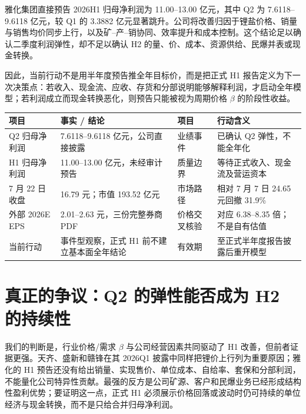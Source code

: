 \begin{houseviewbox}
雅化集团直接预告 2026H1 归母净利润为 11.00--13.00 亿元，其中 Q2 为 7.6118--9.6118 亿元，较 Q1 的 3.3882 亿元显著跳升。公司将改善归因于锂盐价格、销量与销售均价同步上行，以及矿--产--销协同、效率提升和成本控制。这个结论足以确认二季度利润弹性，却不足以确认 H2 的量、价、成本、资源供给、民爆并表或现金转换。

因此，当前行动不是用半年度预告推全年目标价，而是把正式 H1 报告定义为下一次决策点：若收入、现金流、应收、存货和分部说明能够解释利润，才启动全年模型；若利润成立而现金转换恶化，则预告只能被视为周期价格 $\beta$ 的阶段性收益。
\end{houseviewbox}

\begin{exhibitbox}[事件摘要与行动边界]
\begin{tabularx}{\exhibitboxwidth}{L{3.1cm}X L{3.0cm}X}
\toprule
项目 & 事实 / 结论 & 项目 & 行动含义 \\
\midrule
Q2 归母净利润 & 7.6118--9.6118 亿元，公司直接披露 & 业绩事件 & 已确认 Q2 弹性，不能全年化 \\
H1 归母净利润 & 11.00--13.00 亿元，未经审计预告 & 质量边界 & 等待正式收入、现金流及营运资本 \\
7 月 22 日收盘 & 16.79 元；市值 193.52 亿元 & 市场路径 & 相对 7 月 7 日 24.65 元回撤 31.9\% \\
外部 2026E EPS & 2.01--2.63 元，三份完整券商 PDF & 价格交叉核验 & 对应 6.38--8.35 倍；不是自有估值 \\
当前行动 & 事件型观察，正式 H1 前不建立基本面全年结论 & 有效期 & 至正式半年度报告披露后重开模型 \\
\bottomrule
\end{tabularx}
\end{exhibitbox}

\section{真正的争议：Q2 的弹性能否成为 H2 的持续性}

我们的判断是，行业价格/需求 $\beta$ 与公司经营因素共同驱动了 H1 改善，但前者证据更强。天齐、盛新和赣锋在其 2026Q1 披露中同样把锂价上行列为重要原因；雅化的 H1 预告还没有给出销量、实现售价、单位成本、自给率、套保和分部利润，不能量化公司特异性贡献。最强的反方是公司矿源、客户和民爆业务已经形成结构性盈利优势；要证明这一点，正式 H1 必须展示价格回落或波动时仍可持续的单位经济与现金转换，而不是只给合并归母净利润。

